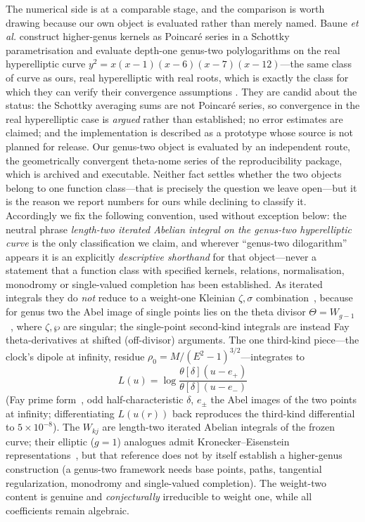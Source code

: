 \documentclass[12pt]{iopart}
\theoremstyle{plain}
\theoremstyle{definition}
\theoremstyle{remark}
\begin{document}
The numerical side is at a comparable stage, and the comparison is worth drawing
because our own object is evaluated rather than merely named. Baune \emph{et al.}
construct higher-genus kernels as Poincar\'e series in a Schottky parametrisation
and evaluate depth-one genus-two polylogarithms on the real hyperelliptic curve
$y^2=x(x-1)(x-6)(x-7)(x-12)$---the same class of curve as ours, real hyperelliptic
with real roots, which is exactly the class for which they can verify their
convergence assumptions \cite[\S\S6.1--6.3]{BauneEtal2024}. They are candid about
the status: the Schottky averaging sums are not Poincar\'e series, so convergence
in the real hyperelliptic case is \emph{argued} rather than established; no error
estimates are claimed; and the implementation is described as a prototype whose
source is not planned for release. Our genus-two object is evaluated by an
independent route, the geometrically convergent theta-nome series of the
reproducibility package, which is archived and executable. Neither fact settles
whether the two objects belong to one function class---that is precisely the
question we leave open---but it is the reason we report numbers for ours while
declining to classify it. Accordingly we fix the
following convention, used without exception below: the neutral phrase
\emph{length-two iterated Abelian integral on the genus-two hyperelliptic curve} is the
only classification we claim, and wherever ``genus-two dilogarithm'' appears it is an
explicitly \emph{descriptive shorthand} for that object---never a statement that a
function class with specified kernels, relations, normalisation, monodromy or
single-valued completion has been established. As iterated integrals
they do \emph{not} reduce to a weight-one Kleinian $\zeta,\sigma$
combination~\cite{BakerAbelian1897,BuchstaberEnolskii1997}, because for
genus two the Abel image of single points lies on the theta divisor
$\Theta=W_{g-1}$~\cite{MumfordTata}, where $\zeta,\wp$ are singular; the single-point
second-kind integrals are instead Fay theta-derivatives at shifted (off-divisor)
arguments. The one third-kind piece---the clock's dipole at infinity, residue
$\rho_0=M/(E^2-1)^{3/2}$---integrates to
\begin{equation}
    L(u)=\log\frac{\theta[\delta](u-e_+)}{\theta[\delta](u-e_-)}
    \label{eq:thirdkind-theta}
\end{equation}
(Fay prime form~\cite{Fay1973}, odd half-characteristic $\delta$, $e_\pm$ the Abel
images of the two points at infinity; differentiating $L(u(r))$ back reproduces the
third-kind differential to $5\times10^{-8}$). The $W_{kj}$ are length-two iterated Abelian integrals of the frozen curve; their
elliptic ($g{=}1$) analogues admit Kronecker--Eisenstein
representations~\cite{BeilinsonLevin1994}, but that reference does not by itself
establish a higher-genus construction (a genus-two framework needs base points, paths,
tangential regularization, monodromy and single-valued completion). The
weight-two content is genuine and \emph{conjecturally} irreducible to weight one, while
all coefficients remain
algebraic.
\end{document}
